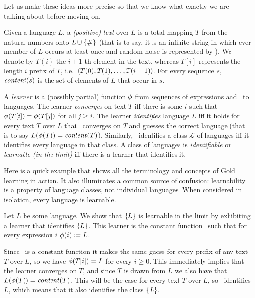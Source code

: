 Let us make these ideas more precise so that we know what exactly we are talking about before moving on.
%
\begin{definition}[Text]
    Given a language $L$, a \emph{(positive) text} over $L$ is a total mapping $T$ from the natural numbers onto $L \cup \left \{ \# \right \}$ (that is to say, it is an infinite string in which ever member of $L$ occurs at least once and random noise is represented by \Noise).
    We denote by $T(i)$ the $i+1$-th element in the text, whereas $T[i]$ represents the length $i$ prefix of $T$, i.e.\ $\left \langle T(0), T(1), \ldots, T(i-1) \right \rangle $.
    For every sequence $s$, $\mathit{content}(s)$ is the set of elements of $L$ that occur in $s$.
\end{definition}
%
\begin{definition}
    A \emph{learner} is a (possibly partial) function $\phi$ from sequences of expressions and \Noise\ to languages.
    The learner \emph{converges} on text $T$ iff there is some $i$ such that $\phi(T[i]) = \phi(T[j])$ for all $j \geq i$.
    The learner \emph{identifies} language $L$ iff it holds for every text $T$ over $L$ that \Learner\ converges on $T$ and guesses the correct language (that is to say $L(\phi(T)) = \mathit{content}(T)$).
    Similarly, \Learner\ identifies a class $\mathcal{L}$ of languages iff it identifies every language in that class.
    A class of languages is \emph{identifiable} or \emph{learnable (in the limit)} iff there is a learner that identifies it.
\end{definition}
%
\begin{examplebox}
    Here is a quick example that shows all the terminology and concepts of Gold learning in action.
    It also illuminates a common source of confusion: learnability is a property of language classes, not individual languages.
    When considered in isolation, every language is learnable.

    Let $L$ be some language.
    We show that $\left \{ L \right \}$ is learnable in the limit by exhibiting a learner that identifies $\left \{ L \right \}$.
    This learner is the constant function \Learner\ such that for every expression $i$ $\phi(i) \mathrel{\mathop:}= L$.

    Since \Learner\ is a constant function it makes the same guess for every prefix of any text $T$ over $L$, so we have $\phi(T[i]) = L$ for every $i \geq 0$.
    This immediately implies that the learner converges on $T$, and since $T$ is drawn from $L$ we also have that $L(\phi(T)) = \mathit{content}(T)$.
    This will be the case for every text $T$ over $L$, so \Learner\ identifies $L$, which means that it also identifies the class $\left \{ L \right \}$.
\end{examplebox}
